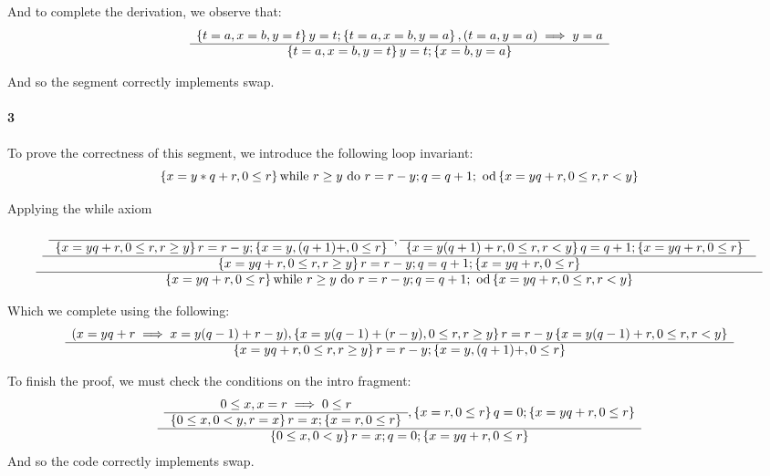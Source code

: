 \documentclass{article}
\begin{document}
And to complete the derivation, we observe that:
\begin{equation*}
\begin{array}{c} \left \{ t = a , x = b , y = t \right \} y = t;  \left \{ t = a , x = b , y = a \right \}
, (t = a , y = a) \implies y = a
 \\ \hline \left \{ t = a , x = b , y = t \right \} y = t;  \left \{ x = b , y = a \right \} \\ \end{array}
\end{equation*}

And so the segment correctly implements swap.

\paragraph{3}

To prove the correctness of this segment, we introduce the following loop invariant:
\begin{equation*}
\left \{ x = y * q + r , 0 \leq r \right \} \text{while }r \geq y \text{ do } r = r - y ; q = q + 1 ; \text{ od} \left \{ x = y q + r , 0 \leq r , r < y \right \}
\end{equation*}

Applying the while axiom
\begin{equation*}
\begin{array}{c}  
\begin{array}{c} 
\begin{array}{c}  \\ \hline \left \{ x = yq + r, 0 \leq r , r \geq y \right \} r = r - y; \left \{ x = y , (q + 1) + , 0 \leq r \right \} \\ \end{array}
,
\begin{array}{c}  \\ \hline \left \{ x = y (q + 1) + r , 0 \leq r , r < y \right \} q = q + 1; \left \{ x = y q + r , 0 \leq r \right \} \\ \end{array}
 \\ \hline \left \{ x = y q + r , 0 \leq r , r \geq y  \right \}  r = r - y ; q = q + 1 ;  \left \{ x = y q + r , 0 \leq r  \right \}  \\ \end{array}  \\ \hline  \left \{ x = y q + r , 0 \leq r \right \} \text{while }r \geq y \text{ do } r = r - y ; q = q + 1 ; \text{ od} \left \{ x = y q + r , 0 \leq r , r < y \right \}  \\ \end{array}
\end{equation*}

Which we complete using the following:
\[ \begin{array}{c} 
(x = yq + r \implies x = y(q-1) + r-y) , \left \{ x = y(q-1) + (r-y) , 0 \leq r , r \geq y \right \} r = r - y \left \{ x = y(q-1) + r , 0 \leq r , r < y \right \}
 \\ \hline \left \{ x = yq + r, 0 \leq r , r \geq y \right \} r = r - y; \left \{ x = y , (q + 1) + , 0 \leq r \right \} \\ \end{array}
\]

To finish the proof, we must check the conditions on the intro fragment:
\[
\begin{array}{c} 
	\begin{array}{c} 0 \leq x , x = r \implies 0 \leq r \\ \hline \left \{ 0 \leq x , 0 < y , r = x \right \}  r = x ;  \left \{  x = r , 0 \leq r \right \} \\ \end{array}
	,
	\left \{ x = r , 0 \leq r \right \}  q = 0;  \left \{  x = yq + r , 0 \leq r \right \}
 \\ \hline 
	\left \{ 0 \leq x , 0 < y \right \} r = x ; q = 0; \left \{ x = yq + r , 0 \leq r \right \}
 \\ \end{array}
\]
And so the code correctly implements swap.
\end{document}
